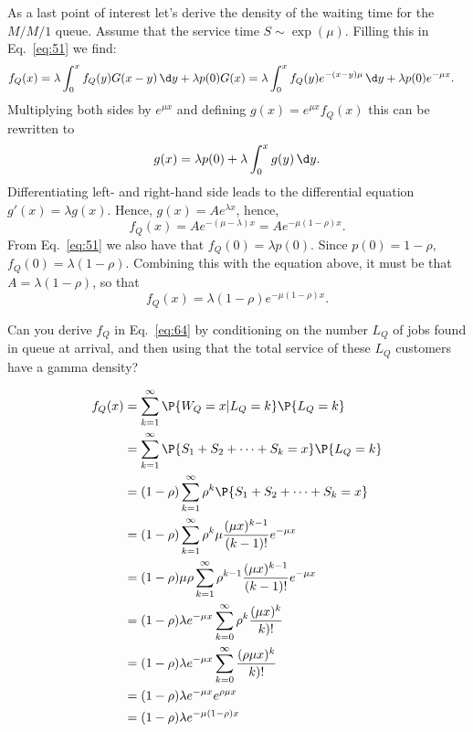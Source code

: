 As a last point of interest let's derive the density of the waiting
time for the $M/M/1$ queue. Assume that the service time
$S\sim \exp(\mu)$. Filling this in Eq.~\cref{eq:51} we find:
\begin{align*}
f_Q(x) &= \lambda \int_0^x f_Q(y) G(x-y) \,\d y + \lambda p(0) G(x)
= \lambda \int_0^x f_Q(y) e^{-(x-y)\mu} \,\d y + \lambda p(0) e^{-\mu x}.
\end{align*}
Multiplying both sides by $e^{\mu x}$ and defining $g(x) =
e^{\mu x} f_Q(x)$ this can be rewritten to
\begin{equation*}
g(x) = \lambda p(0)  + \lambda \int_0^x g(y) \,\d y.
\end{equation*}
Differentiating left- and right-hand side leads to the differential equation $g'(x) = \lambda g(x)$. Hence, $g(x) = A e^{\lambda x}$, hence,
\begin{equation*}
f_Q(x) = A e^{-(\mu-\lambda)x} = A e^{- \mu(1-\rho)x}.
\end{equation*}
From Eq.~\cref{eq:51} we also have that $f_Q(0) = \lambda
p(0)$.
Since $p(0)=1-\rho$, $f_Q(0) = \lambda (1-\rho)$. Combining this with
the equation above, it must be that $A=\lambda(1-\rho)$, so that
\begin{equation}\label{eq:64}
f_Q(x) = \lambda(1-\rho) e^{- \mu(1-\rho)x}.
\end{equation}


\begin{exercise}
  Can you derive $f_Q$ in Eq.~\cref{eq:64} by conditioning on the
  number $L_Q$ of jobs found in queue at arrival, and then using that
  the total service of these $L_Q$ customers have a gamma density?
\begin{solution}
\begin{align*}
f_Q(x)
&= \sum_{k=1}^\infty \P{W_Q = x | L_Q = k}\P{L_Q = k  } \\
&= \sum_{k=1}^\infty \P{S_1 + S_2 + \cdots + S_k = x}\P{L_Q = k  } \\
&= (1-\rho) \sum_{k=1}^\infty \rho^k \P{S_1 + S_2 + \cdots + S_k = x } \\
&= (1-\rho) \sum_{k=1}^\infty \rho^k \mu \frac{(\mu x)^{k-1}}{(k-1)!}e^{-\mu x}\\
&= (1-\rho) \mu \rho \sum_{k=1}^\infty \rho^{k-1} \frac{(\mu x)^{k-1}}{(k-1)!}e^{-\mu x}\\
&= (1-\rho) \lambda e^{-\mu x}\sum_{k=0}^\infty \rho^{k} \frac{(\mu x)^{k}}{k)!}\\
&= (1-\rho) \lambda e^{-\mu x}\sum_{k=0}^\infty \frac{(\rho \mu x)^{k}}{k)!}\\
&= (1-\rho) \lambda e^{-\mu x} e^{\rho \mu x}\\
&= (1-\rho) \lambda e^{-\mu (1-\rho)x}
\end{align*}
\end{solution}
    \end{exercise}
    
